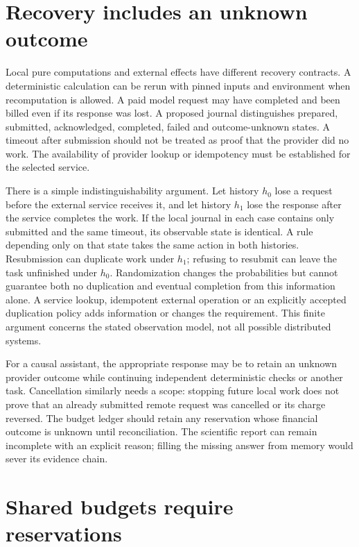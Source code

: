 \section{Recovery includes an unknown outcome}

Local pure computations and external effects have different recovery
contracts. A deterministic calculation can be rerun with pinned inputs and
environment when recomputation is allowed. A paid model request may have
completed and been billed even if its response was lost. A proposed journal
distinguishes prepared, submitted, acknowledged, completed, failed and
outcome-unknown states. A timeout after submission should not be treated as
proof that the provider did no work. The availability of provider lookup or
idempotency must be established for the selected service.
\citep{exec14_l6_design}

There is a simple indistinguishability argument. Let history $h_0$ lose a
request before the external service receives it, and let history $h_1$
lose the response after the service completes the work. If the local
journal in each case contains only submitted and the same timeout, its
observable state is identical. A rule depending only on that state takes
the same action in both histories. Resubmission can duplicate work under
$h_1$; refusing to resubmit can leave the task unfinished under $h_0$.
Randomization changes the probabilities but cannot guarantee both no
duplication and eventual completion from this information alone. A service
lookup, idempotent external operation or an explicitly accepted duplication
policy adds information or changes the requirement. This finite argument
concerns the stated observation model, not all possible distributed
systems. \citep{exec14_l6_exact}

For a causal assistant, the appropriate response may be to retain an
unknown provider outcome while continuing independent deterministic checks
or another task. Cancellation similarly needs a scope: stopping future
local work does not prove that an already submitted remote request was
cancelled or its charge reversed. The budget ledger should retain any
reservation whose financial outcome is unknown until reconciliation. The
scientific report can remain incomplete with an explicit reason; filling
the missing answer from memory would sever its evidence chain.

\section{Shared budgets require reservations}


